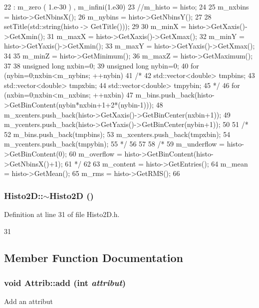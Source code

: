 \begin{DoxyCode}
22                               : m_zero ( 1.e-30 ) , m_infini(1.e30) {
23   //m_histo = histo; 
24   
25   m_nxbins = histo->GetNbinsX();
26   m_nybins = histo->GetNbinsY();
27 
28   setTitle(std::string(histo -> GetTitle()));
29   
30   m_minX = histo->GetXaxis()->GetXmin();
31   m_maxX = histo->GetXaxis()->GetXmax();
32   m_minY = histo->GetYaxis()->GetXmin();
33   m_maxY = histo->GetYaxis()->GetXmax();
34 
35   m_minZ = histo->GetMinimum();
36   m_maxZ = histo->GetMaximum();
37 
38   unsigned long nxbin=0;
39   unsigned long nybin=0;
40   for (nybin=0;nxbin<m_nybins; ++nybin){
41     /*
42       std::vector<double> tmpbins;
43       std::vector<double> tmpxbin;
44       std::vector<double> tmpybin;
45     */
46     for (nxbin=0;nxbin<m_nxbins; ++nxbin){
47       m_bins.push_back(histo->GetBinContent(nybin*nxbin+1+2*(nybin-1)));
48       m_xcenters.push_back(histo->GetXaxis()->GetBinCenter(nxbin+1));
49       m_ycenters.push_back(histo->GetYaxis()->GetBinCenter(nybin+1));
50     }
51     /*
52       m_bins.push_back(tmpbins);
53       m_xcenters.push_back(tmpxbin);
54       m_ycenters.push_back(tmpybin);    
55     */
56   }
57   
58   /*  
59   m_underflow = histo->GetBinContent(0);
60   m_overflow = histo->GetBinContent(histo->GetNbinsX()+1);  
61   */
62 
63   m_content = histo->GetEntries();
64   m_mean    = histo->GetMean();
65   m_rms     = histo->GetRMS();
66 }
\end{DoxyCode}
\hypertarget{classHisto2D_a4df8112579be6bc1d5652933c73125ae}{
\subsubsection[{$\sim$Histo2D}]{\setlength{\rightskip}{0pt plus 5cm}Histo2D::$\sim$Histo2D ()}}
\label{classHisto2D_a4df8112579be6bc1d5652933c73125ae}


Definition at line 31 of file Histo2D.h.


\begin{DoxyCode}
31 { }
\end{DoxyCode}


\subsection{Member Function Documentation}
\hypertarget{classAttrib_a235f773af19c900264a190b00a3b4ad7}{
\subsubsection[{add}]{\setlength{\rightskip}{0pt plus 5cm}void Attrib::add (int {\em attribut})}}
\label{classAttrib_a235f773af19c900264a190b00a3b4ad7}
Add an attribut 

